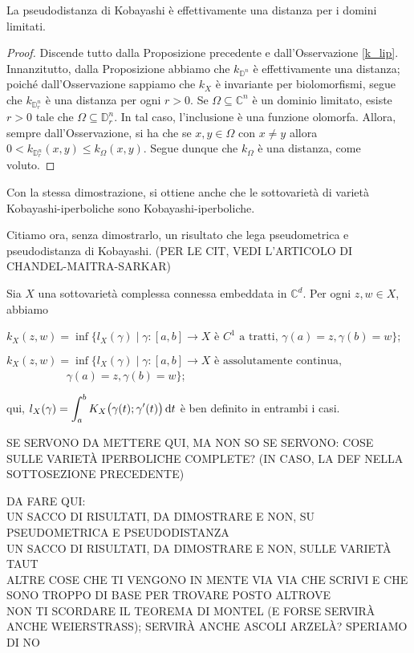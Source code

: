 \begin{cor}
    La pseudodistanza di Kobayashi è effettivamente una distanza per i domini limitati.
\end{cor}
\begin{proof}
    Discende tutto dalla Proposizione precedente e dall'Osservazione \ref{k_lip}. Innanzitutto, dalla Proposizione abbiamo che $k_{\mathbb{D}^n}$ è effettivamente una distanza; poiché dall'Osservazione sappiamo che $k_X$ è invariante per biolomorfismi, segue che $k_{\mathbb{D}_r^n}$ è una distanza per ogni $r>0$. Se $\Omega\subseteq\mathbb{C}^n$ è un dominio limitato, esiste $r>0$ tale che $\Omega\subseteq\mathbb{D}_r^n$. In tal caso, l'inclusione è una funzione olomorfa. Allora, sempre dall'Osservazione, si ha che se $x,y \in \Omega$ con $x\not=y$ allora $0<k_{\mathbb{D}_r^n}(x,y) \le k_{\Omega}(x,y)$. Segue dunque che $k_\Omega$ è una distanza, come voluto.
\end{proof}

\begin{oss}
    Con la stessa dimostrazione, si ottiene anche che le sottovarietà di varietà Kobayashi-iperboliche sono Kobayashi-iperboliche.
\end{oss}

Citiamo ora, senza dimostrarlo, un risultato che lega pseudometrica e pseudodistanza di Kobayashi. (PER LE CIT, VEDI L'ARTICOLO DI CHANDEL-MAITRA-SARKAR)

\begin{thm}
    Sia $X$ una sottovarietà complessa connessa embeddata in $\mathbb{C}^d$. Per ogni $z,w \in X$, abbiamo
    \begin{nlist}
        \item $k_X(z,w)=\inf\{l_X(\gamma) \mid \gamma:[a,b] \longrightarrow X\text{ è $C^1$ a tratti, }\gamma(a)=z,\gamma(b)=w\}$;
        \item $k_X(z,w)=\inf\{l_X(\gamma) \mid \gamma:[a,b] \longrightarrow X\text{ è assolutamente continua,}$\\
        $\text{    }\qquad\qquad\,\,\,\,\gamma(a)=z,\gamma(b)=w\}$;
    \end{nlist}
    qui, $l_X(\gamma)=\displaystyle\int_a^b K_X\big(\gamma(t);\gamma'(t)\big)\mathop{}\!\mathrm{d} t$ è ben definito in entrambi i casi.
\end{thm}

SE SERVONO DA METTERE QUI, MA NON SO SE SERVONO: COSE SULLE VARIETÀ IPERBOLICHE COMPLETE? (IN CASO, LA DEF NELLA SOTTOSEZIONE PRECEDENTE)

DA FARE QUI:\\
UN SACCO DI RISULTATI, DA DIMOSTRARE E NON, SU PSEUDOMETRICA E PSEUDODISTANZA\\
UN SACCO DI RISULTATI, DA DIMOSTRARE E NON, SULLE VARIETÀ TAUT\\
ALTRE COSE CHE TI VENGONO IN MENTE VIA VIA CHE SCRIVI E CHE SONO TROPPO DI BASE PER TROVARE POSTO ALTROVE\\
NON TI SCORDARE IL TEOREMA DI MONTEL (E FORSE SERVIRÀ ANCHE WEIERSTRASS); SERVIRÀ ANCHE ASCOLI ARZELÀ? SPERIAMO DI NO